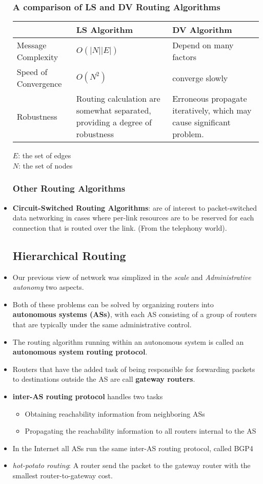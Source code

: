 \documentclass{article}
\begin{document}
\begin{itemize}
\subsubsection*{A comparison of LS and DV Routing Algorithms}
\begin{center}
\begin{tabular}{| l |p{5cm}|p{5cm}|}
  \hline
   & LS Algorithm & DV Algorithm \\ \hline
  Message Complexity & $O(|N||E|)$   & Depend on many factors \\ \hline
  Speed of Convergence  & $O(N^2)$ & converge slowly \\ \hline
  Robustness & Routing calculation are somewhat separated, providing a degree of robustness & Erroneous propagate iteratively, which may cause significant problem. \\ \hline
\end{tabular}
$E$: the set of edges \\
$N$: the set of nodes \\
\end{center}
\subsubsection*{Other Routing Algorithms}
\item \textbf{Circuit-Switched Routing Algorithms}: are of interest to packet-switched data networking in cases where per-link resources are to be reserved for each connection that is routed over the link. (From the telephony world).
\subsection{Hierarchical Routing}
\item Our previous view of network was simplized in the \emph{scale} and \emph{Administrative autonomy} two aspects.
\item Both of these problems can be solved by organizing routers into \textbf{autonomous systems (ASs)}, with each AS consisting of a group of routers that are typically under the same administrative control.
\item The routing algorithm running within an autonomous system is called an \textbf{autonomous system routing protocol}.
\item Routers that have the added task of being responsible for forwarding packets to destinations outside the AS are call \textbf{gateway routers}.
\item \textbf{inter-AS routing protocol} handles two tasks
\begin{itemize}
\item Obtaining reachability information from neighboring ASs
\item Propagating the reachability information to all routers internal to the AS
\end{itemize}
\item In the Internet all ASs run the same inter-AS routing protocol, called BGP4
\item \emph{hot-potato routing}: A router send the packet to the gateway router with the smallest router-to-gateway cost.

\end{itemize}
\end{document}
